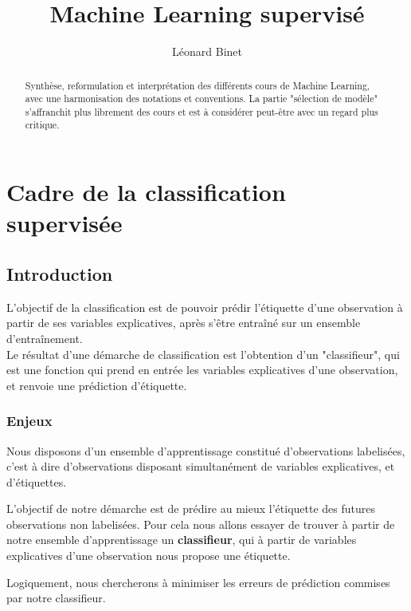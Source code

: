 \documentclass[a4paper]{article}
\title{Machine Learning supervisé}
\author{Léonard Binet}
\theoremstyle{plain}
\begin{document}
\maketitle

\begin{abstract}
Synthèse, reformulation et interprétation des différents cours de Machine Learning, avec une harmonisation des notations et conventions. La partie "sélection de modèle" s'affranchit plus librement des cours et est à considérer peut-être avec un regard plus critique.
\end{abstract}


\pagebreak
\tableofcontents




\pagebreak
\section{Cadre de la classification supervisée}

\subsection{Introduction}

L'objectif de la classification est de pouvoir prédir l'étiquette d'une observation à partir de ses variables explicatives, après s'être entraîné sur un ensemble d'entraînement.\\
Le résultat d'une démarche de classification est l'obtention d'un "classifieur", qui est une fonction qui prend en entrée les variables explicatives d'une observation, et renvoie une prédiction d'étiquette.\\

\subsubsection{Enjeux}

Nous disposons d'un ensemble d'apprentissage constitué d'observations labelisées, c'est à dire d'observations disposant simultanément de variables explicatives, et d'étiquettes.

L'objectif de notre démarche est de prédire au mieux l'étiquette des futures observations non labelisées. Pour cela nous allons essayer de trouver à partir de notre ensemble d'apprentissage un \textbf{classifieur}, qui à partir de variables explicatives d'une observation nous propose une étiquette.

Logiquement, nous chercherons à minimiser les erreurs de prédiction commises par notre classifieur.
\end{document}
